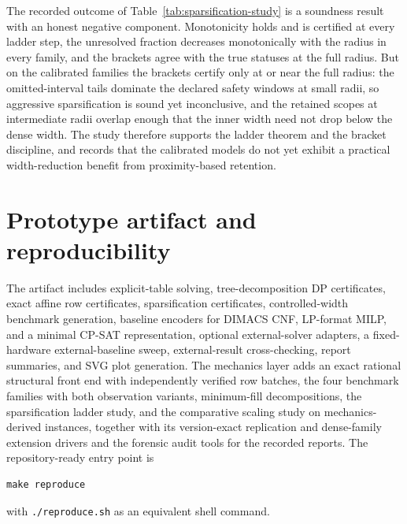 \documentclass[11pt]{article}
\theoremstyle{plain}
\theoremstyle{definition}
\theoremstyle{remark}
\begin{document}
The recorded outcome of Table~\ref{tab:sparsification-study} is a soundness result with an honest negative
component.  Monotonicity holds and is certified at every ladder step, the
unresolved fraction decreases monotonically with the radius in every family,
and the brackets agree with the true statuses at the full radius.  But on
the calibrated families the brackets certify only at or near the full
radius: the omitted-interval tails dominate the declared safety windows at
small radii, so aggressive sparsification is sound yet inconclusive, and the
retained scopes at intermediate radii overlap enough that the inner width
need not drop below the dense width.  The study therefore supports the
ladder theorem and the bracket discipline, and records that the calibrated
models do not yet exhibit a practical width-reduction benefit from
proximity-based retention.

\section{Prototype artifact and reproducibility}
\label{sec:artifact}

The artifact includes explicit-table solving, tree-decomposition DP
certificates, exact affine row certificates, sparsification certificates,
controlled-width benchmark generation, baseline encoders for DIMACS CNF,
LP-format MILP, and a minimal CP-SAT representation, optional
external-solver adapters, a fixed-hardware external-baseline sweep,
external-result cross-checking, report summaries, and SVG plot generation.
The mechanics layer adds an exact rational structural front end with
independently verified row batches, the four benchmark families with both
observation variants, minimum-fill decompositions, the sparsification ladder
study, and the comparative scaling study on mechanics-derived instances,
together with its version-exact replication and dense-family extension
drivers and the forensic audit tools for the recorded reports.
The repository-ready entry point is
\begin{verbatim}
make reproduce
\end{verbatim}
with \texttt{./reproduce.sh} as an equivalent shell command.
\end{document}
